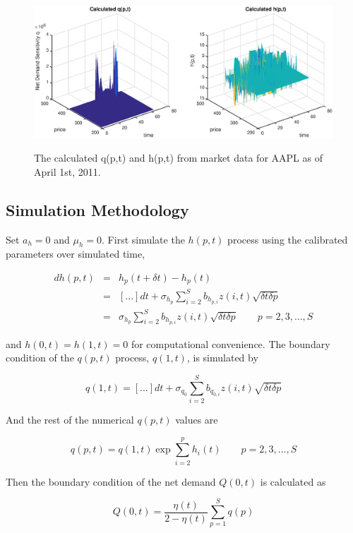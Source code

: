\documentclass{article}
\begin{document}
\begin{center}
\begin{figure}
  \centering
  \includegraphics[scale = 0.5]{q_and_h.eps}\\
  \caption{The calculated q(p,t) and h(p,t) from market data for AAPL as of April 1st, 2011.}\label{fig::AAPL_20110401_q_and_h}
\end{figure}
\end{center}


\subsection{Simulation Methodology}
Set $a_h = 0$ and $\mu_h = 0$. First simulate the $h(p,t)$ process using the calibrated parameters over simulated time,

\begin{eqnarray*}
dh(p,t) &=& h_p(t+\delta t) - h_p(t) \\
        &=& [...]dt + \sigma_{h_p} \sum_{i=2}^{S} b_{h_{p, i}} z(i,t) \sqrt{\delta t \delta p} \\
        &=& \sigma_{h_p} \sum_{i=2}^{S} b_{h_{p, i}} z(i,t) \sqrt{\delta t \delta p} \qquad p = 2, 3, \ldots, S
\end{eqnarray*}

and $h(0,t) = h(1,t) = 0$ for computational convenience. The boundary condition of the $q(p,t)$ process, $q(1,t)$, is simulated by

$$
q(1,t) = [...]dt + \sigma_{q_0} \sum_{i=2}^{S} b_{q_{0, i}} z(i,t) \sqrt{\delta t \delta p}
$$

And the rest of the numerical $q(p,t)$ values are

$$
q(p,t) = q(1,t) \exp{\sum_{i=2}^{p}h_i(t)} \qquad p = 2, 3, \ldots, S
$$

Then the boundary condition of the net demand $Q(0,t)$ is calculated as

$$
Q(0,t) = \frac{\eta(t)}{2-\eta(t)} \sum_{p=1}^{S} q(p)
$$
\end{document}
